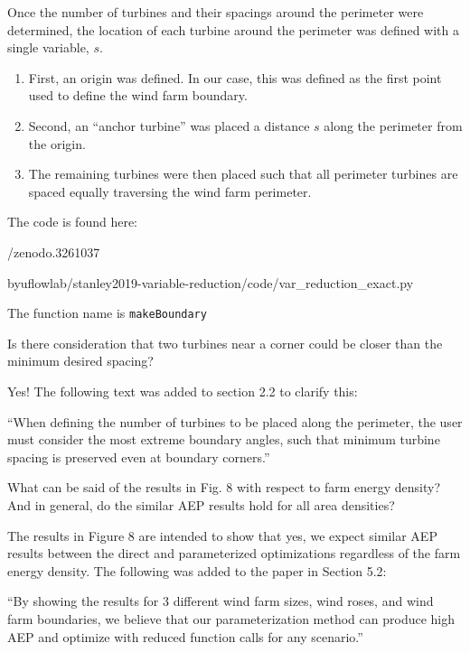 \documentclass[12pt]{report}
\begin{document}
Once the number of turbines and their spacings around the perimeter were determined, the location of each turbine around the perimeter was defined with a single variable, $s$.

\begin{enumerate}

\item First, an origin was defined. In our case, this was defined as the first point used to define the wind farm boundary.
\item Second, an ``anchor turbine'' was placed a distance $s$ along the perimeter from the origin. 
\item The remaining turbines were then placed such that all perimeter turbines are spaced equally traversing the wind farm perimeter.

\end{enumerate}

The code is found here:

/zenodo.3261037 

\smallskip
byuflowlab/stanley2019-variable-reduction/code/var\_reduction\_exact.py

\smallskip
The function name is \texttt{makeBoundary}


\color{black}
\bigskip

Is there consideration that two turbines near a corner could be closer than the minimum desired spacing? 

\bigskip
\color{blue}

Yes! The following text was added to section 2.2 to clarify this:

\smallskip
``When defining the number of turbines to be placed along the perimeter, the user must consider the most extreme boundary angles, such that minimum turbine spacing is preserved even at boundary corners.''

\color{black}
\bigskip

What can be said of the results in Fig. 8 with respect to farm energy density? And in general, do the similar AEP results hold for all area densities? 

\bigskip
\color{blue}

The results in Figure 8 are intended to show that yes, we expect similar AEP results between the direct and parameterized optimizations regardless of the farm energy density. The following was added to the paper in Section 5.2:

\smallskip
``By showing the results for 3 different wind farm sizes, wind roses, and wind farm boundaries, we believe that our parameterization method can produce high AEP and optimize with reduced function calls for any scenario.''
\end{document}
